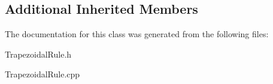 \subsection*{Additional Inherited Members}


The documentation for this class was generated from the following files\+:\begin{DoxyCompactItemize}
\item 
Trapezoidal\+Rule.\+h\item 
Trapezoidal\+Rule.\+cpp\end{DoxyCompactItemize}
